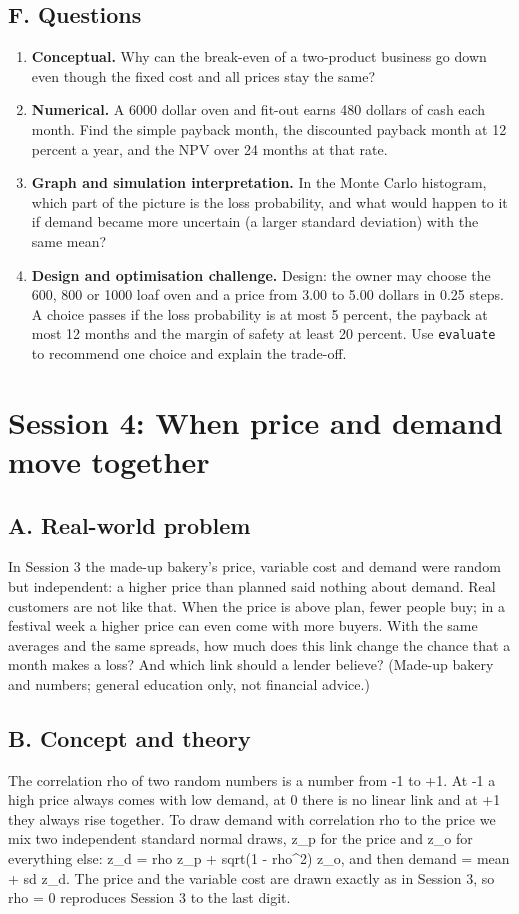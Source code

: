 \documentclass[11pt,a4paper]{article}
\begin{document}
\subsection*{F. Questions}
\begin{enumerate}[nosep]
\item \textbf{Conceptual.} Why can the break-even of a two-product business go down even though the fixed cost and all prices stay the same?
\item \textbf{Numerical.} A 6000 dollar oven and fit-out earns 480 dollars of cash each month. Find the simple payback month, the discounted payback month at 12 percent a year, and the NPV over 24 months at that rate.
\item \textbf{Graph and simulation interpretation.} In the Monte Carlo histogram, which part of the picture is the loss probability, and what would happen to it if demand became more uncertain (a larger standard deviation) with the same mean?
\item \textbf{Design and optimisation challenge.} Design: the owner may choose the 600, 800 or 1000 loaf oven and a price from 3.00 to 5.00 dollars in 0.25 steps. A choice passes if the loss probability is at most 5 percent, the payback at most 12 months and the margin of safety at least 20 percent. Use \texttt{evaluate} to recommend one choice and explain the trade-off.
\end{enumerate}

\section{Session 4: When price and demand move together}

\subsection*{A. Real-world problem}
In Session 3 the made-up bakery's price, variable cost and demand were random but independent: a higher price than planned said nothing about demand. Real customers are not like that. When the price is above plan, fewer people buy; in a festival week a higher price can even come with more buyers. With the same averages and the same spreads, how much does this link change the chance that a month makes a loss? And which link should a lender believe? (Made-up bakery and numbers; general education only, not financial advice.)

\subsection*{B. Concept and theory}
The correlation rho of two random numbers is a number from -1 to +1. At -1 a high price always comes with low demand, at 0 there is no linear link and at +1 they always rise together. To draw demand with correlation rho to the price we mix two independent standard normal draws, z\_p for the price and z\_o for everything else: z\_d = rho z\_p + sqrt(1 - rho\textasciicircum{}2) z\_o, and then demand = mean + sd z\_d. The price and the variable cost are drawn exactly as in Session 3, so rho = 0 reproduces Session 3 to the last digit.
\end{document}
